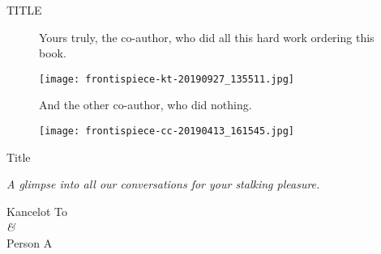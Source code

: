 %
%
\thispagestyle{empty}
\vspace*{2cm}
\begin{center}
    {\LARGE TITLE}
\end{center}
\clearpage


%
%
\thispagestyle{empty}
\vspace*{0.05cm}

\begin{figure}[H]
	\begin{minipage}[b]{0.36\textwidth}
		\raggedleft
    	Yours truly, the co-author, who did all this hard work ordering this book.
	\end{minipage}\hfill
	\begin{minipage}[b]{0.61\textwidth}
	\texttt{[image: frontispiece-kt-20190927\_135511.jpg]}
	\end{minipage}
\end{figure}

\vspace*{0.5cm}

\begin{figure}[H]
	\begin{minipage}[b]{0.36\textwidth}
	\raggedleft
	And the other co-author, who did nothing.
	\end{minipage}\hfill
	\begin{minipage}[b]{0.61\textwidth}
	\texttt{[image: frontispiece-cc-20190413\_161545.jpg]}
	\end{minipage}
\end{figure}
\clearpage


%
%
\thispagestyle{empty}
\vspace*{2cm}
\begin{center}
    {\Huge Title} \\

    \vspace{6ex}

    {\large\itshape A glimpse into all our conversations for your stalking pleasure.} \\

    \vspace{9cm}

    {\LARGE Kancelot To} \\
    \vspace{1.7ex}
    {\Large{}\itshape \&} \\
    \vspace{2.5ex}
    {\LARGE Person A} \\
\end{center}
\clearpage


